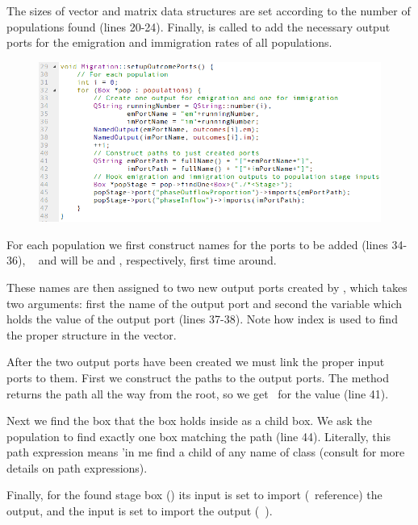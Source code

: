 The sizes of vector and matrix data structures are set according to the number of populations found (lines 20-24). Finally,  is called to add the necessary output ports for the emigration and immigration rates of all populations.

\begin{figure} [ht]
\centering
\includegraphics[scale=0.7,left]{graphics/migration-cpp-setup-outcome-ports}
\end{figure}

For each population we first construct names for the ports to be added (lines 34-36), \ie\  and  will be  and , respectively, first time around.

These names are then assigned to two new output ports created by , which takes two arguments: first the name of the output port and second the variable which holds the value of the output port (lines 37-38). Note how index  is used to find the proper structure in the  vector.

After the two output ports have been created we must link the proper input ports to them. First we construct the paths to the output ports. The  method returns the path all the way from the root, so we get \eg\ for  the value  (line 41).

Next we find the  box that the  box holds inside as a child box. We ask the population to find exactly one box matching the path  (line 44). Literally, this path expression means 'in me find a child of any name of class  (consult  for more details on path expressions).

Finally, for the found stage box () its  input is set to import (\ie\ reference) the  output, and the  input is set to import the  output (\cf\ ).

